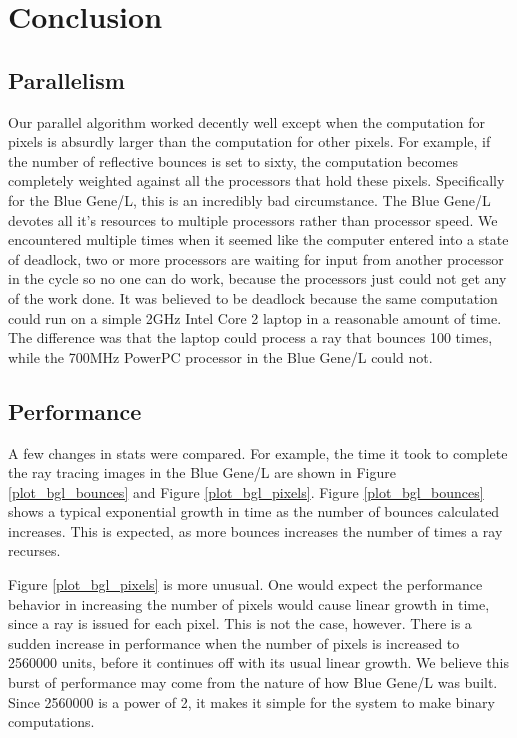 \documentclass{acmsiggraph}
\begin{document}
\section{Conclusion}
\subsection{Parallelism}
Our parallel algorithm worked decently well except when the computation for pixels
is absurdly larger than the computation for other pixels. For example, if the
number of reflective bounces is set to sixty, the computation becomes completely
weighted against all the processors that hold these pixels. Specifically for
the Blue Gene/L, this is an incredibly bad circumstance. The Blue Gene/L devotes all it's
resources to multiple processors rather than processor speed. We encountered
multiple times when it seemed like the computer entered into a state of deadlock,
two or more processors are waiting for input from another processor in the cycle
so no one can do work, because the processors just could not get any of the work
done. It was believed to be deadlock because the same computation could run on a
simple 2GHz Intel Core 2\texttrademark{} laptop in a reasonable amount of time.
The difference was that the laptop could process a ray that bounces 100 times,
while the 700MHz PowerPC processor in the Blue Gene/L could not.

\subsection{Performance}
A few changes in stats were compared.  For example, the time it took to complete
the ray tracing images in the Blue Gene/L are shown in Figure \ref{plot_bgl_bounces} and
Figure \ref{plot_bgl_pixels}.  Figure \ref{plot_bgl_bounces} shows a typical
exponential growth in time as the number of bounces calculated increases.
This is expected, as more bounces increases the number of times a ray recurses.

Figure \ref{plot_bgl_pixels} is more unusual.  One would expect the performance
behavior in increasing the number of pixels would cause linear growth in time,
since a ray is issued for each pixel.  This is not the case, however.
There is a sudden increase in performance when the number of pixels is increased
to 2560000 units, before it continues off with its usual linear growth. 
We believe this burst of performance may come from the nature of how Blue Gene/L was built.
Since 2560000 is a power of 2, it makes it simple for the system to make
binary computations.
\end{document}
